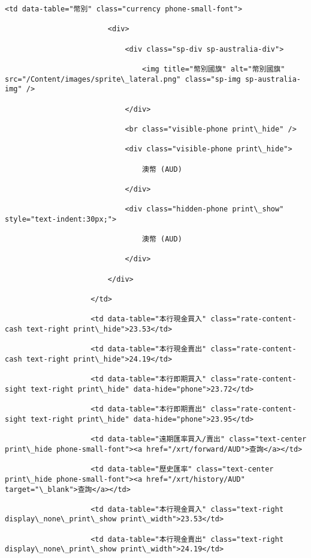 \documentclass[11pt]{article}
\begin{document}
\begin{Verbatim}[commandchars=\\\{\}]
                    <td data-table="幣別" class="currency phone-small-font">

                        <div>

                            <div class="sp-div sp-australia-div">

                                <img title="幣別國旗" alt="幣別國旗" src="/Content/images/sprite\_lateral.png" class="sp-img sp-australia-img" />

                            </div>

                            <br class="visible-phone print\_hide" />

                            <div class="visible-phone print\_hide">

                                澳幣 (AUD)

                            </div>

                            <div class="hidden-phone print\_show" style="text-indent:30px;">

                                澳幣 (AUD)

                            </div>

                        </div>

                    </td>

                    <td data-table="本行現金買入" class="rate-content-cash text-right print\_hide">23.53</td>

                    <td data-table="本行現金賣出" class="rate-content-cash text-right print\_hide">24.19</td>

                    <td data-table="本行即期買入" class="rate-content-sight text-right print\_hide" data-hide="phone">23.72</td>

                    <td data-table="本行即期賣出" class="rate-content-sight text-right print\_hide" data-hide="phone">23.95</td>

                    <td data-table="遠期匯率買入/賣出" class="text-center print\_hide phone-small-font"><a href="/xrt/forward/AUD">查詢</a></td>

                    <td data-table="歷史匯率" class="text-center print\_hide phone-small-font"><a href="/xrt/history/AUD" target="\_blank">查詢</a></td>

                    <td data-table="本行現金買入" class="text-right display\_none\_print\_show print\_width">23.53</td>

                    <td data-table="本行現金賣出" class="text-right display\_none\_print\_show print\_width">24.19</td>


\end{Verbatim}
\end{document}
